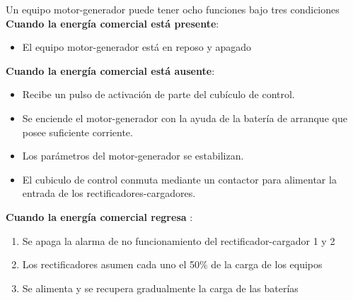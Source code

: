 \documentclass[
	12pt, %
	fleqn, %
	a4paper, %
	oneside, %
]{LegrandOrangeBook}
\begin{document}
\begin{example}
Un equipo motor-generador puede tener ocho funciones bajo tres condiciones\\
\textbf{Cuando la energía comercial está presente}:
\begin{itemize}
\item El equipo motor-generador está en reposo y apagado
\end{itemize}
\textbf{Cuando la energía comercial está ausente}:
\begin{itemize}
\item Recibe un pulso de activación de parte del cubículo de control.
\item Se enciende el motor-generador con la ayuda de la batería de arranque que posee
suficiente corriente.
\item Los parámetros del motor-generador se estabilizan.
\item El cubiculo de control conmuta mediante un contactor para alimentar la entrada de los
rectificadores-cargadores.
\end{itemize}
\textbf{Cuando la energía comercial regresa
}:
\begin{enumerate}
\item Se apaga la alarma de no funcionamiento del rectificador-cargador 1 y 2
\item Los rectificadores asumen cada uno el 50\% de la carga de los equipos
\item Se alimenta y se recupera gradualmente la carga de las baterías
\end{enumerate}
\end{example}
\end{document}
